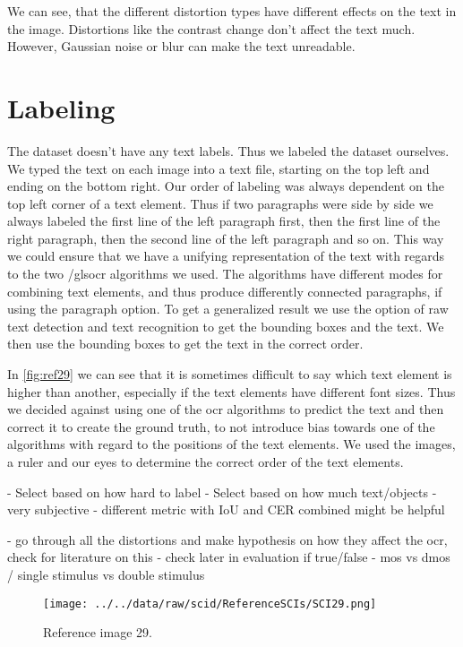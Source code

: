 We can see, that the different distortion types have different effects on the text in the image.
Distortions like the contrast change don't affect the text much.
However, Gaussian noise or blur can make the text unreadable.
\section{Labeling}
\label{sec:dataset_labeling}

The dataset doesn't have any text labels.
Thus we labeled the dataset ourselves.
We typed the text on each image into a text file, starting on the top left and ending on the bottom right.
Our order of labeling was always dependent on the top left corner of a text element.
Thus if two paragraphs were side by side we always labeled the first line of the left paragraph first, then the first line of the right paragraph, then the second line of the left paragraph and so on.
This way we could ensure that we have a unifying representation of the text with regards to the two /gls{ocr} algorithms we used.
The algorithms have different modes for combining text elements, and thus produce differently connected paragraphs, if using the paragraph option.
To get a generalized result we use the option of raw text detection and text recognition to get the bounding boxes and the text.
We then use the bounding boxes to get the text in the correct order.

In \autoref{fig:ref29} we can see that it is sometimes difficult to say which text element is higher than another, especially if the text elements have different font sizes.
Thus we decided against using one of the \gls{ocr} algorithms to predict the text and then correct it to create the ground truth, to not introduce bias towards one of the algorithms with regard to the positions of the text elements.
We used the images, a ruler and our eyes to determine the correct order of the text elements.

- Select based on how hard to label
- Select based on how much text/objects
- very subjective
- different metric with IoU and CER combined might be helpful

- go through all the distortions and make hypothesis on how they affect the ocr, check for literature on this
- check later in evaluation if true/false
- mos vs dmos / single stimulus vs double stimulus

\begin{figure}
    \centering
    \texttt{[image: ../../data/raw/scid/ReferenceSCIs/SCI29.png]}
    \caption{Reference image 29.}
    \label{fig:ref29}
\end{figure}

